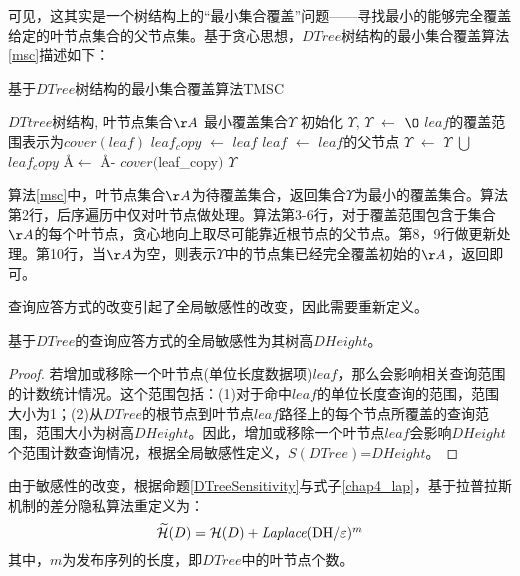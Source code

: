 可见，这其实是一个树结构上的“最小集合覆盖”问题——寻找最小的能够完全覆盖给定的叶节点集合的父节点集。基于贪心思想，$DTree$树结构的最小集合覆盖算法\ref{msc}描述如下：
\begin{algorithm}
	\caption{基于$DTree$树结构的最小集合覆盖算法TMSC}\label{euclid}
	\label{msc}
	\begin{algorithmic}[1]
		\REQUIRE $DTtree$树结构, 叶节点集合$\AA$
		\ENSURE 最小覆盖集合$\Upsilon$
		初始化 $\Upsilon$, $\Upsilon$ $\leftarrow$ $\O$
		\STATE $leaf$的覆盖范围表示为$cover(leaf)$
		\STATE $leaf_copy$ $\leftarrow$ $leaf$
		\STATE $leaf$ $\leftarrow$ $leaf$的父节点
		\ENDWHILE 
		\STATE $\Upsilon$ $\leftarrow$ $\Upsilon$ $\bigcup$ $leaf_copy$
		\STATE \AA $\leftarrow$ \AA - $cover($leaf_copy$)$
		\IF{\AA = $\O$}
		\RETURN $\Upsilon$
		\ENDIF
		\ENDFOR
	\end{algorithmic}
\end{algorithm}

算法\ref{msc}中，叶节点集合$\AA$为待覆盖集合，返回集合$\Upsilon$为最小的覆盖集合。算法第2行，后序遍历中仅对叶节点做处理。算法第3-6行，对于覆盖范围包含于集合$\AA$的每个叶节点，贪心地向上取尽可能靠近根节点的父节点。第8，9行做更新处理。第10行，当$\AA$为空，则表示$\Upsilon$中的节点集已经完全覆盖初始的$\AA$，返回即可。

查询应答方式的改变引起了全局敏感性的改变，因此需要重新定义。

\begin{prop}
	\label{DTreeSensitivity}
	基于$DTree$的查询应答方式的全局敏感性为其树高$DHeight$。
\end{prop}
\begin{proof}
	若增加或移除一个叶节点(单位长度数据项)$leaf$，那么会影响相关查询范围的计数统计情况。这个范围包括：(1)对于命中$leaf$的单位长度查询的范围，范围大小为1；(2)从$DTree$的根节点到叶节点$leaf$路径上的每个节点所覆盖的查询范围，范围大小为树高$DHeight$。因此，增加或移除一个叶节点$leaf$会影响$DHeight$个范围计数查询情况，根据全局敏感性定义，$S(DTree)$=$DHeight$。
\end{proof}

由于敏感性的改变，根据命题\ref{DTreeSensitivity}与式子\ref{chap4_lap}，基于拉普拉斯机制的差分隐私算法重定义为：
\begin{equation}
\label{chap4_dtree}
\widetilde{\mathcal{H}}(D) = \mathcal{H}(D) + \textit{Laplace}($DH$/\varepsilon)^m
\end{equation}
其中，$m$为发布序列的长度，即$DTree$中的叶节点个数。

